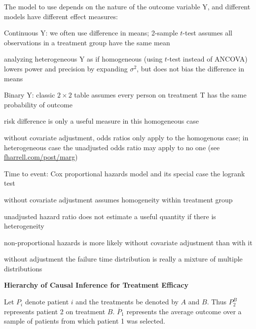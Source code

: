 The model to use depends on the nature of the outcome variable Y, and
different models have different effect measures:

\bi
\item Continuous Y: we often use difference in means; 2-sample $t$-test assumes all observations in a treatment group have the same mean
  \bi
  \item analyzing heterogeneous Y as if homogeneous (using $t$-test instead of ANCOVA) lowers power and precision by expanding $\sigma^2$, but does not bias the difference in means
  \ei
\item Binary Y: classic $2\times 2$ table assumes every person on treatment T has the same probability of outcome
  \bi
  \item risk difference is only a useful measure in this homogeneous case
  \item without covariate adjustment, odds ratios only apply to the homogenous case; in heterogeneous case the unadjusted odds ratio may apply to no one (see
    \href{https://www.fharrell.com/post/marg}{fharrell.com/post/marg})
  \ei
\item Time to event: Cox proportional hazards model and its special case the logrank test
  \bi 
  \item without covariate adjustment assumes homogeneity within treatment group
  \item unadjusted hazard ratio does not estimate a useful quantity if there is heterogeneity
  \item non-proportional hazards is more likely without covariate adjustment than with it
    \bi
    \item without adjustment the failure time distribution is really a mixture of multiple distributions
    \ei
  \ei
\ei
    
\bigskip

{\smaller[-1] \textbf{Hierarchy of Causal Inference for Treatment Efficacy}}

\bigskip

Let $P_{i}$ denote patient $i$ and the treatments be denoted by $A$
and $B$.  Thus $P_{2}^{B}$ represents patient 2 on treatment $B$.
$\overline{P}_{1}$ represents the average outcome over a sample of
patients from which patient 1 was selected.

\medskip

